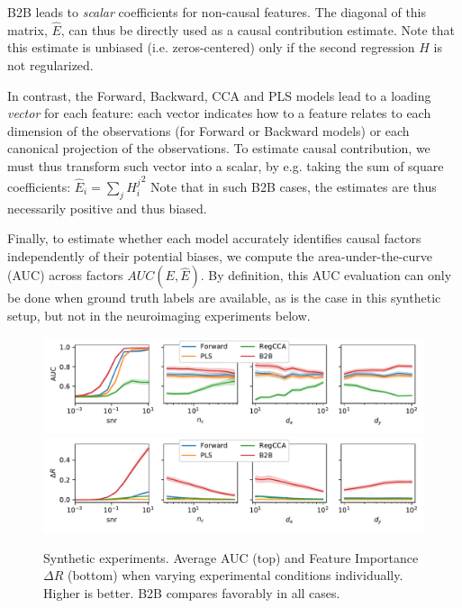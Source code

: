 %
B2B leads to \emph{scalar} coefficients for non-causal
features. The diagonal of this matrix, $\hat E$, can thus be directly used
as a causal contribution estimate. Note that this estimate is unbiased (i.e.
zeros-centered) only if the second regression $H$ is not regularized.

In contrast, the Forward, Backward, CCA and PLS models lead to a
loading \emph{vector} for each feature: each vector indicates how to a feature
relates to each dimension of the observations (for Forward or Backward
models) or each canonical projection of the observations.
To estimate causal contribution, we must thus transform such vector into a
scalar, by e.g. taking the sum of square coefficients:
  $\hat E_i = \sum_j {H^j_i}^2 $
Note that in such B2B cases, the estimates are  thus necessarily positive and thus biased.

Finally, to estimate whether each model accurately identifies causal factors independently of
their potential biases, we compute the
area-under-the-curve (AUC) across factors $AUC(E, \hat E)$.
By definition, this AUC evaluation can only be done when ground truth labels are available, as is the case in
this synthetic setup, but not in the neuroimaging experiments below.

\begin{figure}[t]
  \centering
  \includegraphics[width=\linewidth]{figures/auc_condition.pdf}
  \includegraphics[width=\linewidth]{figures/r_in_condition.pdf}
  \vspace{-4ex}
  \caption{Synthetic experiments. Average AUC (top) and Feature Importance
  $\Delta R$ (bottom) when varying experimental conditions individually.
  Higher is better. B2B compares favorably in all cases.
  \label{fig:percondition}}
\end{figure}


